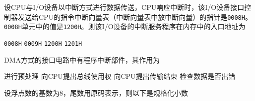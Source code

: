 \documentclass{exam}
\newif\ifprint
\newcommand{\blank}[2][1cm]{\uline{\makebox[#1][c]{%
			\ifprint
			\phantom{#2}%
			\else
			#2%
			\fi}}}
\begin{document}
\begin{questions}
	\question 设CPU与I/O设备以中断方式进行数据传送，CPU响应中断时，该I/O设备接口控制器发送给CPU的指令中断向量表（中断向量表中放中断向量）的指针是\verb|0008H|。\verb|0008H|单元中的值是\verb|1200H|。则该I/O设备的中断服务程序在内存中的入口地址为\blank{}
	\begin{choices}
		\choice \verb|0008H|
		\choice \verb|0009H|
		\choice \verb|1200H|
        \choice \verb|1201H|
	\end{choices}
    
    \question DMA方式的接口电路中有程序中断部件，其作用为\blank{}
    \begin{choices}
    	\choice 进行预处理
    	\choice 向CPU提出总线使用权
    	\choice 向CPU提出传输结束
        \choice 检查数据是否出错
    \end{choices}

    \question 设浮点数的基数为8，尾数用原码表示，则以下\blank{}是规格化小数
    \begin{choices}
    \end{choices}
\end{questions}
\end{document}
